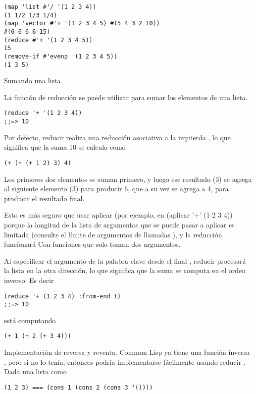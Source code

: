 \documentclass[11pt]{article}
\begin{document}
\begin{itemize}
\begin{verbatim}
(map 'list #'/ '(1 2 3 4))
(1 1/2 1/3 1/4)
(map 'vector #'+ '(1 2 3 4 5) #(5 4 3 2 10))
#(6 6 6 6 15)
(reduce #'+ '(1 2 3 4 5))
15
(remove-if #'evenp '(1 2 3 4 5))
(1 3 5)

\end{verbatim}

Sumando una lista 

La función de reducción se puede utilizar para sumar
los elementos de una lista.

\begin{verbatim}
(reduce '+ '(1 2 3 4))
;;=> 10
\end{verbatim}

Por defecto, reducir realiza una reducción asociativa a la izquierda ,
lo que significa que la suma 10 se calcula como

\begin{verbatim}
(+ (+ (+ 1 2) 3) 4)
\end{verbatim}

Los primeros dos elementos se suman primero, y luego ese resultado (3)
se agrega al siguiente elemento (3) para producir 6, que a su vez se
agrega a 4, para producir el resultado final.

Esto es más seguro que usar aplicar (por ejemplo, en (aplicar '+' (1 2
3 4)) porque la longitud de la lista de argumentos que se puede pasar
a aplicar es limitada (consulte el límite de argumentos de llamadas ),
y la reducción funcionará Con funciones que solo toman dos argumentos.

Al especificar el argumento de la palabra clave desde el final ,
reducir procesará la lista en la otra dirección, lo que significa que
la suma se computa en el orden inverso. Es decir


\begin{verbatim}
(reduce '+ (1 2 3 4) :from-end t)
;;=> 10
\end{verbatim}

está computando

\begin{verbatim}
(+ 1 (+ 2 (+ 3 4)))
\end{verbatim}


Implementación de reversa y reventa.  Common Lisp ya tiene una función
inversa , pero si no lo tenía, entonces podría implementarse
fácilmente usando reducir . Dada una lista como

\begin{verbatim}
(1 2 3) === (cons 1 (cons 2 (cons 3 '())))
\end{verbatim}


\end{itemize}
\end{document}
